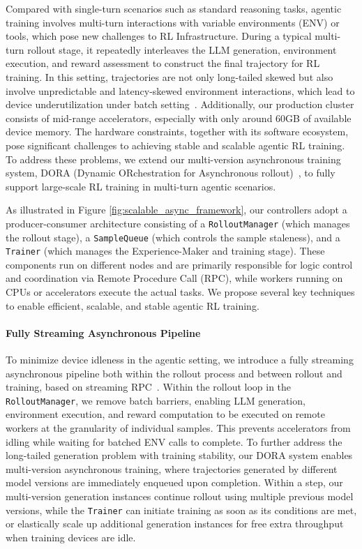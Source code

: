 \documentclass{article}
\begin{document}
Compared with single-turn scenarios such as standard reasoning tasks, agentic training involves multi-turn interactions with variable environments (ENV) or tools, which pose new challenges to RL Infrastructure. During a typical multi-turn rollout stage, it repeatedly interleaves the LLM generation, environment execution, and reward assessment to construct the final trajectory for RL training. In this setting, trajectories are not only long-tailed skewed but also involve unpredictable and latency-skewed environment interactions, which lead to device underutilization under batch setting~\citep{fu2025areal,zhang2025agentrl,lu2025part}. Additionally, our production cluster consists of mid-range accelerators, especially with only around 60GB of available device memory. The hardware constraints, together with its software ecosystem, pose significant challenges to achieving stable and scalable agentic RL training. To address these problems, we extend our multi-version asynchronous training system, DORA (Dynamic ORchestration for Asynchronous rollout)~\citep{team2025introducing}, to fully support large-scale RL training in multi-turn agentic scenarios.

As illustrated in Figure \ref{fig:scalable_async_framework}, our controllers adopt a producer-consumer architecture consisting of a \texttt{RolloutManager} (which manages the rollout stage), a \texttt{SampleQueue} (which controls the sample staleness), and a \texttt{Trainer} (which manages the Experience-Maker and training stage). 
These components run on different nodes and are primarily responsible for logic control and coordination via Remote Procedure Call (RPC), while workers running on CPUs or accelerators execute the actual tasks. We propose several key techniques to enable efficient, scalable, and stable agentic RL training.

\paragraph{Fully Streaming Asynchronous Pipeline} 
To minimize device idleness in the agentic setting, we introduce a fully streaming asynchronous pipeline both within the rollout process and between rollout and training, based on streaming RPC~\citep{team2025introducing}. Within the rollout loop in the \texttt{RolloutManager}, we remove batch barriers, enabling LLM generation, environment execution, and reward computation to be executed on remote workers at the granularity of individual samples. This prevents accelerators from idling while waiting for batched ENV calls to complete. To further address the long-tailed generation problem with training stability, our DORA system enables multi-version asynchronous training, where trajectories generated by different model versions are immediately enqueued upon completion. Within a step, our multi-version generation instances continue rollout using multiple previous model versions, while the \texttt{Trainer} can initiate training as soon as its conditions are met, or elastically scale up additional generation instances for free extra throughput when training devices are idle.
\end{document}
